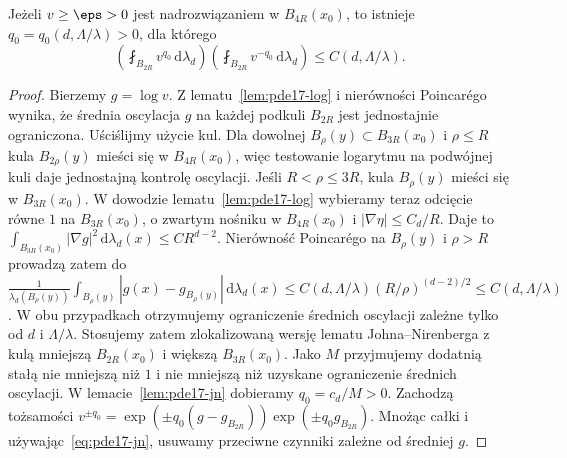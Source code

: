 \begin{wniosek}
\label{cor:pde17-bridge}
Jeżeli $v\ge\eps>0$ jest nadrozwiązaniem w $B_{4R}(x_0)$,
to istnieje $q_0=q_0(d,\Lambda/\lambda)>0$, dla którego
\begin{equation}\label{eq:pde17-bridge}
 \left(\fint_{B_{2R}}v^{q_0}\,\mathrm d\lambda_d\right)
 \left(\fint_{B_{2R}}v^{-q_0}\,\mathrm d\lambda_d\right)
 \le C(d,\Lambda/\lambda).
\end{equation}
\end{wniosek}
\begin{proof}
Bierzemy $g=\log v$. Z lematu~\ref{lem:pde17-log}
i nierówności Poincarégo wynika, że średnia oscylacja $g$
na każdej podkuli $B_{2R}$ jest jednostajnie ograniczona.
Uściślijmy użycie kul. Dla dowolnej
$B_\rho(y)\subset B_{3R}(x_0)$ i $\rho\le R$
kula $B_{2\rho}(y)$ mieści się w $B_{4R}(x_0)$,
więc testowanie logarytmu na podwójnej kuli daje
jednostajną kontrolę oscylacji. Jeśli $R<\rho\le3R$, kula $B_\rho(y)$ mieści się w
$B_{3R}(x_0)$. W dowodzie lematu~\ref{lem:pde17-log} wybieramy teraz
odcięcie równe $1$ na $B_{3R}(x_0)$, o zwartym nośniku
w $B_{4R}(x_0)$ i $|\nabla\eta|\le C_d/R$. Daje to
$\int_{B_{3R}(x_0)}|\nabla g|^2\,\mathrm d\lambda_d(x)
\le C R^{d-2}$.
Nierówność Poincarégo na $B_\rho(y)$ i $\rho>R$
prowadzą zatem do
$\frac{1}{\lambda_d(B_\rho(y))}\int_{B_\rho(y)}|g(x)-g_{B_\rho(y)}|\,\mathrm d\lambda_d(x)
\le C(d,\Lambda/\lambda)(R/\rho)^{(d-2)/2}
\le C(d,\Lambda/\lambda)$.
W obu przypadkach
otrzymujemy ograniczenie średnich oscylacji zależne
tylko od $d$ i $\Lambda/\lambda$. Stosujemy zatem
zlokalizowaną wersję lematu Johna--Nirenberga z kulą
mniejszą $B_{2R}(x_0)$ i większą $B_{3R}(x_0)$.
Jako $M$ przyjmujemy dodatnią stałą nie mniejszą niż $1$
i nie mniejszą niż uzyskane ograniczenie średnich oscylacji.
W lemacie~\ref{lem:pde17-jn} dobieramy $q_0=c_d/M>0$.
Zachodzą tożsamości
$v^{\pm q_0}=\exp(\pm q_0(g-g_{B_{2R}}))
\exp(\pm q_0g_{B_{2R}})$.
Mnożąc całki i używając~\eqref{eq:pde17-jn}, usuwamy
przeciwne czynniki zależne od średniej $g$.
\end{proof}

